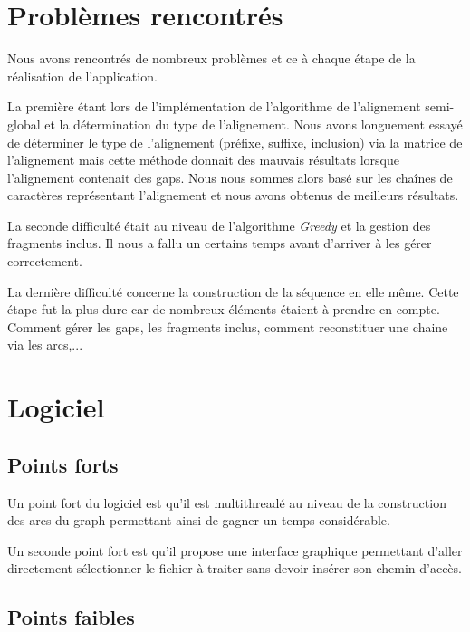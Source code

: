 \documentclass[12pt,a4paper,final]{article}
\begin{document}
\newpage
\section{Problèmes rencontrés}

Nous avons rencontrés de nombreux problèmes et ce à chaque étape de la réalisation de l'application.\medskip

La première étant lors de l'implémentation de l'algorithme de l'alignement semi-global et la détermination du type de l'alignement.  Nous avons longuement essayé de déterminer le type de l'alignement (préfixe, suffixe, inclusion) via la matrice de l'alignement mais cette méthode donnait des mauvais résultats lorsque l'alignement contenait des gaps.  Nous nous sommes alors basé sur les chaînes de caractères représentant l'alignement et nous avons obtenus de meilleurs résultats.\medskip

La seconde difficulté était au niveau de l'algorithme \textit{Greedy} et la gestion des fragments inclus.  Il nous a fallu un certains temps avant d'arriver à les gérer correctement.\medskip

La dernière difficulté concerne la construction de la séquence en elle même.  Cette étape fut la plus dure car de nombreux éléments étaient à prendre en compte.  Comment gérer les gaps, les fragments inclus, comment reconstituer une chaine via les arcs,...

\newpage
\section{Logiciel}

\subsection{Points forts}

Un point fort du logiciel est qu'il est multithreadé au niveau de la construction des arcs du graph permettant ainsi de gagner un temps considérable.

Un seconde point fort est qu'il propose une interface graphique permettant d'aller directement sélectionner le fichier à traiter sans devoir insérer son chemin d'accès.

\subsection{Points faibles}
\end{document}
